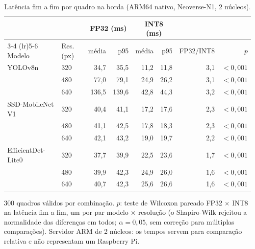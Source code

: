 \begin{table}[t]
\centering
\footnotesize
\caption{Latência fim a fim por quadro na borda (ARM64 nativo, Neoverse-N1, 2 núcleos).}
\label{tab:latencia_borda}
\setlength{\tabcolsep}{4pt}
\begin{tabular}{@{}ll*{4}{r}rr@{}}
\toprule
& & \multicolumn{2}{c}{FP32 (ms)} & \multicolumn{2}{c}{INT8 (ms)} & & \\ \cmidrule(lr){3-4} \cmidrule(lr){5-6}
Modelo & {Res. (px)} & {média} & {p95} & {média} & {p95} & {FP32/INT8} & {$p$} \\
\midrule
YOLOv8n & 320 & 34,7 & 35,5 & 11,2 & 11,8 & 3,1 & {$<0{,}001$} \\
 & 480 & 77,0 & 79,1 & 24,9 & 26,2 & 3,1 & {$<0{,}001$} \\
 & 640 & 136,5 & 139,6 & 42,8 & 44,3 & 3,2 & {$<0{,}001$} \\
SSD-MobileNet V1 & 320 & 40,4 & 41,1 & 17,2 & 17,6 & 2,3 & {$<0{,}001$} \\
 & 480 & 41,1 & 42,5 & 17,8 & 18,3 & 2,3 & {$<0{,}001$} \\
 & 640 & 42,1 & 43,2 & 19,0 & 19,7 & 2,2 & {$<0{,}001$} \\
EfficientDet-Lite0 & 320 & 37,7 & 39,9 & 22,5 & 23,6 & 1,7 & {$<0{,}001$} \\
 & 480 & 39,9 & 42,3 & 24,9 & 26,0 & 1,6 & {$<0{,}001$} \\
 & 640 & 40,7 & 42,3 & 25,6 & 26,6 & 1,6 & {$<0{,}001$} \\
\bottomrule
\end{tabular}
\par\smallskip
\parbox{0.96\linewidth}{\scriptsize 300 quadros válidos por combinação. $p$: teste de Wilcoxon pareado FP32 $\times$ INT8 na latência fim a fim, um por par modelo $\times$ resolução (o Shapiro-Wilk rejeitou a normalidade das diferenças em todos; $\alpha = 0{,}05$, sem correção para múltiplas comparações). Servidor ARM de 2 núcleos: os tempos servem para comparação relativa e não representam um Raspberry Pi.}
\end{table}
